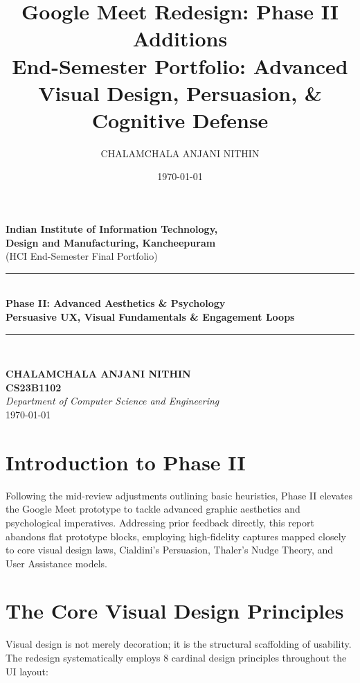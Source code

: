 \documentclass[12pt,a4paper]{article}
\title{\textbf{Google Meet Redesign: Phase II Additions}\\
\large End-Semester Portfolio: Advanced Visual Design, Persuasion, \& Cognitive Defense}
\author{CHALAMCHALA ANJANI NITHIN}
\date{\today}
\begin{document}
\begin{titlepage}
\begin{center}

{\LARGE \textbf{Indian Institute of Information Technology,\\
Design and Manufacturing, Kancheepuram}}\\[1.5cm]

{\large (HCI End-Semester Final Portfolio)}\\[3cm]

\rule{\linewidth}{0.5pt}\\[0.4cm]
{\Huge \textbf{Phase II: Advanced Aesthetics \& Psychology}}\\[0.3cm]
{\Large \textbf{Persuasive UX, Visual Fundamentals \& Engagement Loops}}\\[0.3cm]
\rule{\linewidth}{0.5pt}\\[2cm]

\vfill

\textbf{CHALAMCHALA ANJANI NITHIN}\\[0.2cm]
\textbf{CS23B1102}\\[0.2cm]
\textit{Department of Computer Science and Engineering}\\[0.5cm]

{\large \today}

\end{center}
\end{titlepage}

\newpage
\tableofcontents
\newpage

\section{Introduction to Phase II}

Following the mid-review adjustments outlining basic heuristics, Phase II elevates the Google Meet prototype to tackle advanced graphic aesthetics and psychological imperatives. Addressing prior feedback directly, this report abandons flat prototype blocks, employing high-fidelity captures mapped closely to core visual design laws, Cialdini’s Persuasion, Thaler's Nudge Theory, and User Assistance models.

\section{The Core Visual Design Principles}
Visual design is not merely decoration; it is the structural scaffolding of usability. The redesign systematically employs 8 cardinal design principles throughout the UI layout:
\end{document}
